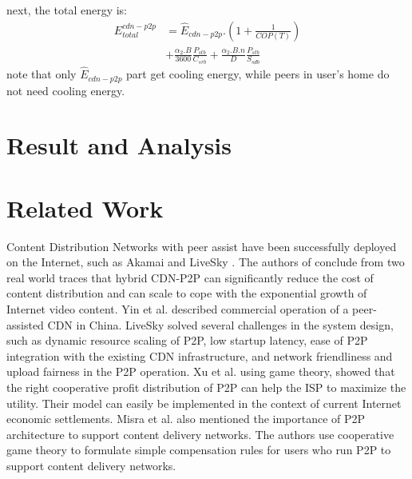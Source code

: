 \documentclass[JIP]{ipsj}
\begin{document}
next, the total energy is:
\begin{equation}\label{eq:cdn-p2p-total}
\begin{split}
	E_{total}^{cdn-p2p} &= \hat{E}_{cdn-p2p}.\left( 1 + \frac{1}{COP(T)} \right) \\
	&+ \frac{\alpha_2.B}{3600}\frac{P_{stb}}{C_{srb}} + \frac{\alpha_2.B.n}{D}\frac{P_{stb}}{S_{sdb}}
\end{split}
\end{equation}
note that only $\hat{E}_{cdn-p2p}$ part get cooling energy, while peers in user's home do not need cooling energy. 






\section{Result and Analysis}\label{analysis}


\section{Related Work} 

Content Distribution Networks with peer assist have been successfully deployed on the Internet, such as Akamai \cite{Huang:2008:UHC:1496046.1496064} and LiveSky \cite{Yin:2010:LEC:1823746.1823750}.  
The authors of \cite{Huang:2008:UHC:1496046.1496064} conclude from two real world traces that hybrid CDN-P2P can significantly reduce the cost of content distribution and can scale to cope with the exponential growth of Internet video content.  
Yin et al. \cite{Yin:2010:LEC:1823746.1823750} described commercial operation of a peer-assisted CDN in China.  
LiveSky solved several challenges in the system design, such as dynamic resource scaling of P2P, low startup latency, ease of P2P integration with the existing CDN infrastructure, and network friendliness and upload fairness in the P2P operation.  
Xu et al.\cite{DBLP:journals/corr/abs-1212-4915} using game theory, showed that the right cooperative profit distribution of P2P can help the ISP to maximize the utility.  
Their model can easily be implemented in the context of current Internet economic settlements.  
Misra et al.\cite{Misra:2010:IPS:1811099.1811064} also mentioned the importance of P2P architecture to support content delivery networks.
The authors use cooperative game theory to formulate simple compensation rules for users who run P2P to support content delivery networks.
\end{document}
